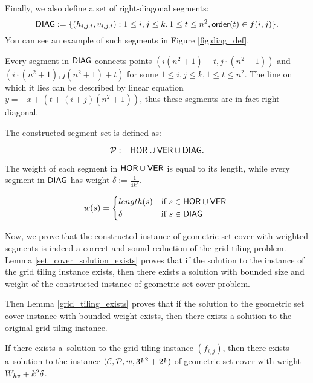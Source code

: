 Finally, we also define a set of right-diagonal segments:
$$\mathsf{DIAG} := \{ (h_{i, j, t}, v_{i, j, t}) :
	1 \le i, j \le k, 1 \le t \le n^2, \mathsf{order}(t) \in f(i, j)\}.$$
You can see an example of such segments in Figure \ref{fig:diag_def}.



Every segment in $\mathsf{DIAG}$
connects points $(i(n^2+1) + t, j \cdot (n^2+1))$
and ${(i \cdot (n^2+1), j(n^2+1) + t)}$
for some $1 \le i,j \le k, 1 \le t \le n^2$.
The line on which it lies can be described
by linear equation ${y=-x+(t+(i+j)(n^2+1))}$,
thus these segments are in fact right-diagonal.

The constructed segment set is defined as:

$$\mathcal{P} := \mathsf{HOR} \cup \mathsf{VER} \cup \mathsf{DIAG}.$$

The weight of each segment in $\mathsf{HOR} \cup \mathsf{VER}$
is equal to its length,
while every segment in $\mathsf{DIAG}$ has weight
$\delta := \frac{1}{4k^4}$.



\begin{equation}
w(s) =
	\begin{cases*}
	  length(s) 			& if $s \in \allhor \cup \allver$ \\
	  \delta        & if $s \in \alldiag$
	\end{cases*}
\end{equation}

Now, we prove that the constructed instance of geometric set cover
with weighted segments is indeed a correct and sound reduction
of the grid tiling problem. Lemma \ref{set_cover_solution_exists}
proves that if the solution to the instance of the grid tiling instance exists,
then there exists a solution with bounded size and weight
of the constructed instance of geometric set cover problem.

Then Lemma \ref{grid_tiling_exists} proves that if
the solution to the geometric set cover instance with bounded weight exists,
then there exists a solution to the original grid tiling instance.

\begin{lemma}
\label{set_cover_solution_exists}
	If there exists a~solution to the grid tiling instance $(f_{i,j})$,
	then there exists a~solution to the instance $(\mathcal{C}, \mathcal{P}, w, 3k^2+2k)$
	of geometric set cover with weight $W_{hv} +k^2\delta$.
\end{lemma}

